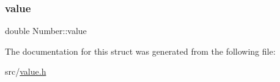 \mbox{\label{struct_number_a39c0611c6e740a144f7450fe529f8f1e}} 
\subsubsection{\texorpdfstring{value}{value}}
{\footnotesize\ttfamily double Number\+::value}



The documentation for this struct was generated from the following file\+:\begin{DoxyCompactItemize}
\item 
src/\hyperlink{value_8h}{value.\+h}\end{DoxyCompactItemize}
